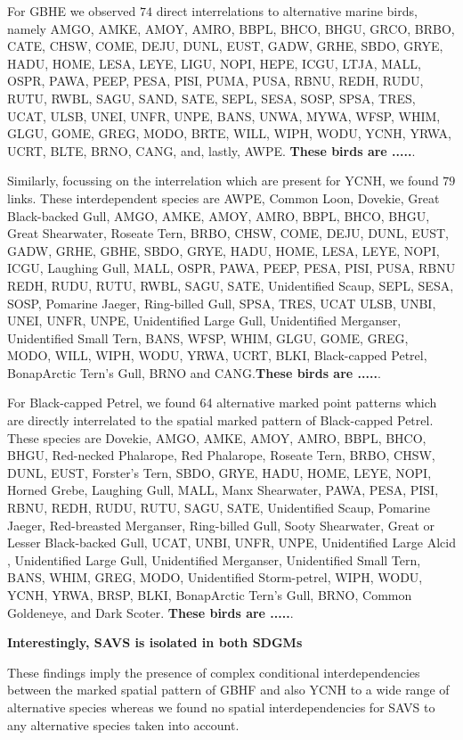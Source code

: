 \documentclass{statsoc}
\begin{document}
For GBHE we observed $74$ direct interrelations to alternative marine birds, namely AMGO, AMKE, AMOY, AMRO, BBPL, BHCO, BHGU, GRCO, BRBO, CATE, CHSW, COME, DEJU, DUNL, EUST,  GADW, GRHE, SBDO, GRYE, HADU, HOME, LESA, LEYE, 
LIGU, NOPI, HEPE, ICGU, LTJA, MALL, OSPR,  PAWA, PEEP, PESA, PISI, PUMA, PUSA, RBNU, REDH,  RUDU, RUTU, RWBL, SAGU, SAND, SATE, SEPL,
 SESA, SOSP, SPSA, TRES, UCAT, ULSB, UNEI, UNFR, UNPE, BANS, UNWA, MYWA, WFSP, WHIM, GLGU,  GOME, GREG, MODO, BRTE, WILL, WIPH, WODU, YCNH, YRWA, UCRT, BLTE, BRNO, CANG, and, lastly, AWPE. \textbf{These birds are .....}.  
 
Similarly, focussing on the interrelation which are present for YCNH, we found $79$ links. These interdependent species are  AWPE, Common Loon, Dovekie, Great Black-backed Gull, AMGO, AMKE, AMOY, AMRO, BBPL, BHCO, BHGU, Great Shearwater, Roseate Tern, BRBO, CHSW, COME, DEJU, DUNL, EUST, GADW, GRHE, GBHE, SBDO, GRYE,  HADU, HOME, LESA, LEYE, NOPI, ICGU, Laughing Gull, MALL, OSPR, PAWA, PEEP, PESA, PISI, PUSA, RBNU
 REDH, RUDU, RUTU, RWBL, SAGU, SATE, Unidentified Scaup, SEPL, SESA, SOSP, Pomarine Jaeger, Ring-billed Gull, SPSA, TRES, UCAT  ULSB, UNBI, UNEI, UNFR, UNPE, Unidentified Large Gull, Unidentified Merganser, Unidentified Small Tern, BANS, WFSP, WHIM, GLGU, GOME, GREG, MODO, WILL, WIPH, WODU, YRWA, UCRT, BLKI, Black-capped Petrel,   BonapArctic Tern's Gull, BRNO and CANG.\textbf{These birds are .....}. 
 
For Black-capped Petrel, we found 64 alternative marked point patterns which are directly interrelated to the spatial marked pattern of Black-capped Petrel. These species are 
  Dovekie, AMGO, AMKE, AMOY, AMRO, BBPL, BHCO, BHGU, Red-necked Phalarope, Red Phalarope, Roseate Tern, BRBO, CHSW, DUNL, EUST, Forster's Tern, SBDO, GRYE, HADU, HOME, LEYE, NOPI, Horned Grebe, Laughing Gull, MALL,  Manx Shearwater, PAWA, PESA, PISI, RBNU,  REDH, RUDU, RUTU, SAGU, SATE, Unidentified Scaup, Pomarine Jaeger, Red-breasted Merganser,  Ring-billed Gull, Sooty Shearwater, Great or Lesser Black-backed Gull, UCAT, UNBI, UNFR, UNPE,
 Unidentified Large Alcid , Unidentified Large Gull, Unidentified Merganser, Unidentified Small Tern, BANS, WHIM, GREG, MODO,  Unidentified Storm-petrel, WIPH, WODU, YCNH, YRWA, BRSP, BLKI,
   BonapArctic Tern's Gull, BRNO, Common Goldeneye, and Dark Scoter. \textbf{These birds are .....}. 
 

\textbf{Interestingly, SAVS is isolated in both SDGMs}

These findings imply the presence of complex conditional interdependencies between the marked spatial pattern of GBHF and also YCNH to a wide range of alternative species whereas we found no spatial interdependencies for SAVS to any alternative species taken into account. 
\end{document}
